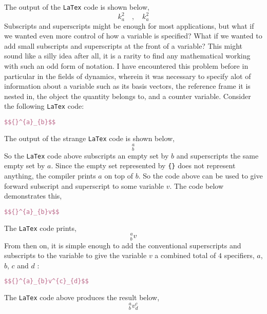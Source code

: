 \documentclass[a4paper, 12pt]{report}
\begin{document}
\begin{center}
The output of the \texttt{LaTex} code is shown below,
$$k_{a}^{2} \quad,\quad k^{2}_{a}$$
Subscripts and superscripts might be enough for most applications, but what if we wanted even more control of how a variable is specified? What if we wanted to add small subscripts and superscripts at the front of a variable? This might sound like a silly idea after all, it is a rarity to find any mathematical working with such an odd form of notation. I have encountered this problem before in particular in the fields of dynamics, wherein it was necessary to specify alot of information about a variable such as its basis vectors, the reference frame it is nested in, the object the quantity belongs to, and a counter variable. Consider the following \texttt{LaTex} code:
\begin{lstlisting}[language=tex]
$${}^{a}_{b}$$
\end{lstlisting}
The output of the strange \texttt{LaTex} code is shown below,
$${}^{a}_{b}$$
So the \texttt{LaTex} code above subscripts an empty set by $b$ and superscripts the same empty set by $a$. Since the empty set represented by \texttt{\{\}} does not represent anything, the compiler prints $a$ on top of $b$. So the code above can be used to give forward subscript and superscript to some variable $v$. The code below demonstrates this,
\begin{lstlisting}[language=tex]
$${}^{a}_{b}v$$
\end{lstlisting}
The \texttt{LaTex} code prints,
$${}^{a}_{b}v$$
From then on, it is simple enough to add the conventional superscripts and subscripts to the variable to give the variable $v$ a combined total of $4$ specifiers, $a$, $b$, $c$ and $d$ :
\begin{lstlisting}[language=tex]
$${}^{a}_{b}v^{c}_{d}$$
\end{lstlisting}
The \texttt{LaTex} code above produces the result below,
$${}^{a}_{b}v^{c}_{d}$$




\end{center}
\end{document}
